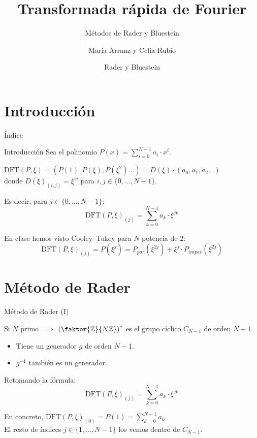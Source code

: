 \documentclass[spanish]{beamer}
\author{María Arranz y Celia Rubio}
\title{Transformada rápida de Fourier}
\subtitle{Métodos de Rader y Bluestein}
\date{Rader y Bluestein}
\newcommand{\DFT}{\text{DFT}}
\begin{document}
\section{Introducción}
\begin{frame}{Índice}
    \tableofcontents
\end{frame}

\begin{frame}{Introducción}
    Sea el polinomio $P(x)=\sum\limits_{i=0}^{N-1}a_i\cdot x^i$.

    \begin{definition}
    $\DFT(P,\xi) = \left(P(1),P(\xi),P(\xi^2)...\right) = D(\xi)\cdot (a_0,a_1,a_2...)$\\[\bigskipamount]
    donde $D(\xi)_{(i,j)}=\xi^{ij}$ para $i,j\in\{0,...,N-1\}$. 
    \end{definition}
    
    Es decir,  para $j\in\{0,...,N-1\}$:
    \begin{equation*}
    \DFT(P,\xi)_{(j)}=\sum\limits_{k=0}^{N-1} a_k \cdot\xi^{jk}
    \end{equation*}
    
    En clase hemos visto Cooley–Tukey para $N$ potencia de $2$:
    \begin{equation*}
        \DFT(P,\xi)_{(j)}=P(\xi^j)=P_{par}(\xi^{2j})+\xi^j\cdot P_{impar}(\xi^{2j})
    \end{equation*}
\end{frame}

\section{Método de Rader}

\begin{frame}{Método de Rader (I)}\medskip

    Si $N$ primo $\implies$
    $\left(\faktor{\mathbb{Z}}{N\mathbb{Z}}\right)^*$ es el grupo cíclico $C_{N-1}$ de orden $N-1$.\\[\smallskipamount]
    \begin{itemize}
        \item Tiene un generador $g$ de orden $N-1$.
        \item $g^{-1}$ también es un generador.
    \end{itemize}\bigskip
    
    Retomando la fórmula:
    \begin{equation*}
        \DFT(P,\xi)_{(j)}=\sum\limits_{k=0}^{N-1} a_k \cdot\xi^{jk}
    \end{equation*}
    
    En concreto, $\DFT(P,\xi)_{(0)}=P(1)=\sum\limits_{k=0}^{N-1} a_k $.\\[\bigskipamount]
    
    El resto de índices $j\in\{1,...,N-1\}$ los vemos dentro de $C_{N-1}$. 
\end{frame}
\end{document}
